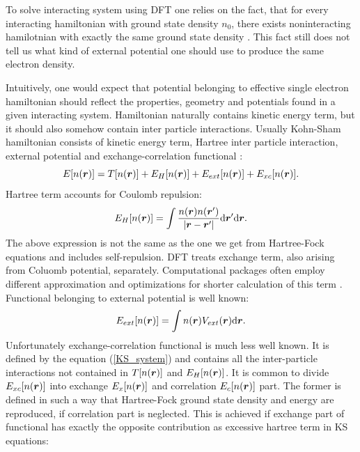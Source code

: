 \documentclass[openany, longbibliography,slovene,a4paper,12pt]{article}
\def\vec#1{\mbox{\boldmath$#1$}}
\newcommand{\dif}{\mathrm{d}}
\begin{document}
To solve interacting system using DFT one relies on the fact, that for every
interacting hamiltonian with ground state density $n_0$, there exists
noninteracting hamilotnian with exactly the same ground state density \cite{advanced_course}.
This fact still does not tell us what kind of external potential
one should use to produce the same electron density.

Intuitively, one would expect that potential belonging to effective single
electron hamiltonian should reflect the properties, geometry and potentials found
in a given interacting system. Hamiltonian naturally contains kinetic energy
term, but it should also somehow contain inter particle interactions. Usually
Kohn-Sham hamiltonian consists of kinetic energy term, Hartree inter particle
interaction, external potential and exchange-correlation functional \cite{advanced_course}:
\begin{equation} \label{KS_system}
  E[n(\vec r)]=T[n(\vec r)] + E_H[n(\vec r)] + E_{ext}[n(\vec r)] + E_{xc}[n(\vec r)].
\end{equation}
Hartree term accounts for Coulomb repulsion:
\begin{equation} \label{hartree_term1}
  E_H[n(\vec r)] = \int\frac{ n(\vec r) n(\vec r')}{|\vec r -  \vec r'|} \dif \vec r' \dif \vec r.
\end{equation}
The above expression is not the same as the one we get from Hartree-Fock
equations and includes self-repulsion. DFT treats exchange term, also arising
from Coluomb potential, separately. Computational packages often employ different
approximation and optimizations for shorter calculation of this term \cite{orca}.
Functional belonging to external potential is well known: 
\begin{equation} \label{ext_potential_functional}
  E_{ext}[n(\vec r)] = \int n(\vec r) V_{ext}(\vec r) \dif \vec r.
\end{equation}
Unfortunately exchange-correlation functional is much less well known. It is
defined by the equation (\ref{KS_system}) and contains all the inter-particle
interactions not contained in $T[n(\vec r)]$ and $ E_H[n(\vec r)]$. It is
common to divide $E_{xc}[n(\vec r)]$ into exchange $E_x[n(\vec r)]$ and
correlation $E_c[n(\vec r)]$ part. The former is defined in such a way that
Hartree-Fock ground state density and energy are reproduced, if correlation part
is neglected. This is achieved if exchange part of functional has exactly the
opposite contribution as excessive hartree term in KS equations: 
\end{document}
